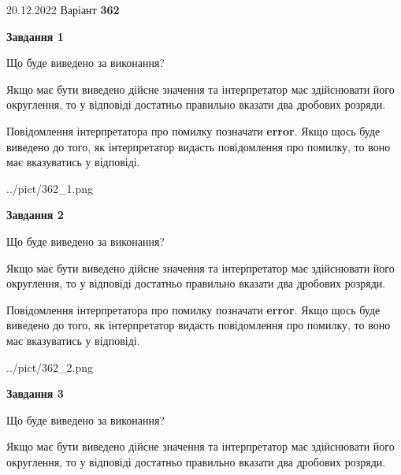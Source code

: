 \documentclass[12pt, ukrainian]{article}
\begin{document}
{20.12.2022 Варіант \No \textbf { 362 }\par}
{
\begin {Large}

{\begin {center}\textbf{Завдання 1}\end {center}}\par
Що буде виведено за виконання? \par

Якщо має бути виведено дійсне значення та інтерпретатор має здійснювати його округлення, 
то у відповіді достатньо правильно вказати два дробових розряди.

Повідомлення інтерпретатора про помилку позначати \textbf{error}.
Якщо щось буде виведено до того, як інтерпретатор видасть повідомлення про помилку, 
то воно має вказуватись у відповіді. \par

\begin{center}
	{../pict/362_1.png}
\end{center}
\newpage

{\begin {center}\textbf{Завдання 2}\end {center}}\par
Що буде виведено за виконання? \par

Якщо має бути виведено дійсне значення та інтерпретатор має здійснювати його округлення, 
то у відповіді достатньо правильно вказати два дробових розряди.

Повідомлення інтерпретатора про помилку позначати \textbf{error}.
Якщо щось буде виведено до того, як інтерпретатор видасть повідомлення про помилку, 
то воно має вказуватись у відповіді. \par

\begin{center}
	{../pict/362_2.png}
\end{center}
\newpage

{\begin {center}\textbf{Завдання 3}\end {center}}\par
Що буде виведено за виконання? \par

Якщо має бути виведено дійсне значення та інтерпретатор має здійснювати його округлення, 
то у відповіді достатньо правильно вказати два дробових розряди.


\end{Large}}
\end{document}
